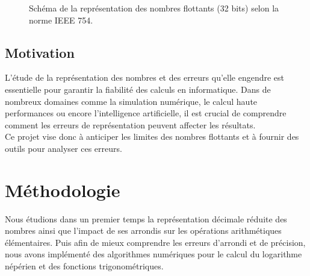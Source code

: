 \documentclass{article}
\begin{document}
\begin{figure}[h]
\centering
{}
\caption{Schéma de la représentation des nombres flottants (32 bits) selon la norme IEEE 754.}
\label{fig:ieee754}
\end{figure}

\subsection{Motivation}
L’étude de la représentation des nombres et des erreurs qu'elle engendre est essentielle pour garantir la fiabilité des calculs en informatique. Dans de nombreux domaines comme la simulation numérique, le calcul haute performances ou encore l’intelligence artificielle, il est crucial de comprendre comment les erreurs de représentation peuvent affecter les résultats.\\
Ce projet vise donc à anticiper les limites des nombres flottants et à fournir des outils pour analyser ces erreurs.


\section{Méthodologie}
Nous étudions dans un premier temps la représentation décimale réduite des nombres ainsi que l'impact de ses arrondis sur les opérations arithmétiques élémentaires. Puis afin de mieux comprendre les erreurs d'arrondi et de précision, nous avons implémenté des algorithmes numériques pour le calcul du logarithme népérien et des fonctions trigonométriques.
\end{document}

